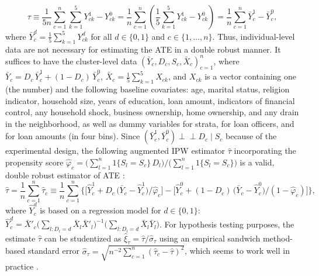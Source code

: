 \documentclass[12pt]{article}
\newcommand{\orth}{\ensuremath{\perp\!\!\!\perp}}%
\newcommand{\indep}{\orth}%
\begin{document}
$$\tau \equiv \frac{1}{5n}\sum_{c = 1}^n \sum_{k = 1}^5 Y^1_{ck} - Y^0_{ck} = \frac{1}{n}\sum_{c = 1}^n\left(\frac{1}{5}\sum_{k = 1}^5 Y^1_{ck} - Y^0_{ck}\right) = \frac{1}{n} \sum_{c = 1}^n \bar{Y}^1_c - \bar{Y}^0_c,$$
where $\bar{Y}^d_c = \frac{1}{5} \sum_{k = 1}^5 Y^d_{ck}$ for all $d \in \{0,1\}$ and $c \in \{1, \dots, n\}$. Thus, individual-level data are not necessary for estimating the ATE in a double robust manner. It suffices to have the cluster-level data $(\bar{Y}_c, D_c, S_c, \bar{X}_c)_{c = 1}^n$, where $\bar{Y}_c = D_c\,\bar{Y}^1_c + (1 - D_c)\,\bar{Y}^0_c$, $\bar{X}_c = \frac{1}{5}\sum_{k = 1}^5 X_{ck}$, and $X_{ck}$ is a vector containing one (the number) and the following baseline covariates: age, marital status, religion indicator, household size, years of education, loan amount, indicators of financial control, any household shock, business ownership, home ownership, and any drain in the neighborhood, as well as dummy variables for strata, for loan officers, and for loan amounts (in four bins). Since $(\bar{Y}^1_c,\bar{Y}^0_c) \indep D_c \mid S_c$ because of the experimental design, the following augmented IPW estimator $\widehat{\tau}$ incorporating the propensity score $\hat{\varphi}_c =\big(\sum_{l = 1}^n 1\{S_l = S_c\}\,D_l\big)/\big(\sum_{l = 1}^n 1\{S_l = S_c\}\big)$ is a valid, double robust estimator of ATE \citep{athey2017estimating, ding2018causal, lunceford2004stratification}:
$$\widehat{\tau} = \frac{1}{n}\sum_{c = 1}^n \widehat{\tau}_c \equiv \frac{1}{n}\sum_{c = 1}^n \Big\{\big[\hat{Y}^1_c + D_c\,\big(\bar{Y}_c - \hat{Y}^1_c\big)/\hat{\varphi}_c\big] -\big[\hat{Y}^0_c + (1-D_c)\,\big(\bar{Y}_c - \hat{Y}^0_c\big)/(1 - \hat{\varphi}_c)\big]\Big\},$$
where $\hat{Y}^d_c$ is based on a regression model for $d \in \{0,1\}$: $\hat{Y}^d_c = \bar{X}'_c\big(\sum_{l: D_l = d} \bar{X}_l\bar{X}'_l\big)^{-1}\big(\sum_{l: D_l = d} \bar{X}_l\bar{Y}_l\big)$. For hypothesis testing purposes, the estimate $\widehat{\tau}$ can be studentized as $\widehat{\xi}_\tau = \widehat{\tau}/\widehat{\sigma}_\tau$ using an empirical sandwich method-based standard error $\widehat{\sigma}_\tau = \sqrt{n^{-2}\sum_{c = 1}^n (\widehat{\tau}_c - \widehat{\tau})^2}$, which seems to work well in practice \citep{lunceford2004stratification}.
\end{document}
